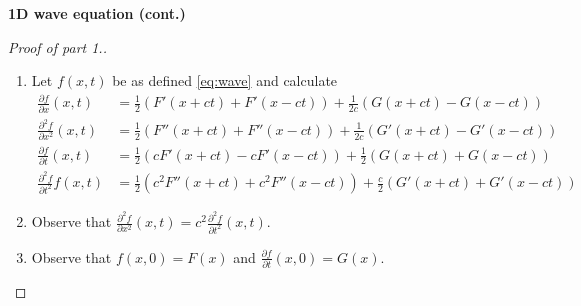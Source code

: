 \textbf{1D wave equation (cont.)}
\begin{proof}[Proof of part 1.]
    \begin{enumerate}
        \item Let \(f(x,t)\) be as defined \eqref{eq:wave} and calculate
              \[
                  \begin{aligned}
                      \tfrac{\partial f}{\partial x} (x,t)
                       & = \tfrac{1}{2} \left(F'(x+ct) + F'(x-ct)\right)
                      + \tfrac{1}{2c}\left(G(x+ct) - G(x-ct)\right)               \\
                      \tfrac{\partial^2 f}{\partial x^2}(x,t)
                       & = \tfrac{1}{2} \left(F''(x+ct) + F''(x-ct)\right)
                      + \tfrac{1}{2c}\left(G'(x+ct) - G'(x-ct)\right)             \\
                      \tfrac{\partial f}{\partial t} (x,t)
                       & = \tfrac{1}{2} \left(cF'(x+ct) - c F'(x-ct)\right)
                      + \tfrac{1}{2}\left(G(x+ct) + G(x-ct)\right)                \\
                      \tfrac{\partial^2 f}{\partial t^2} f(x,t)
                       & = \tfrac{1}{2} \left(c^2F''(x+ct) + c^2 F''(x-ct)\right)
                      + \tfrac{c}{2}\left(G'(x+ct) + G'(x-ct)\right)
                  \end{aligned}
              \]
        \item Observe that  \(   \frac{\partial^2 f}{\partial x^2}(x,t) = c^2  \frac{\partial^2 f}{\partial t^2}(x,t) \).
        \item Observe that \(f(x,0) = F(x)\)
              and \(\frac{\partial f}{\partial t}(x,0) = G(x)\).
    \end{enumerate}
\end{proof}






